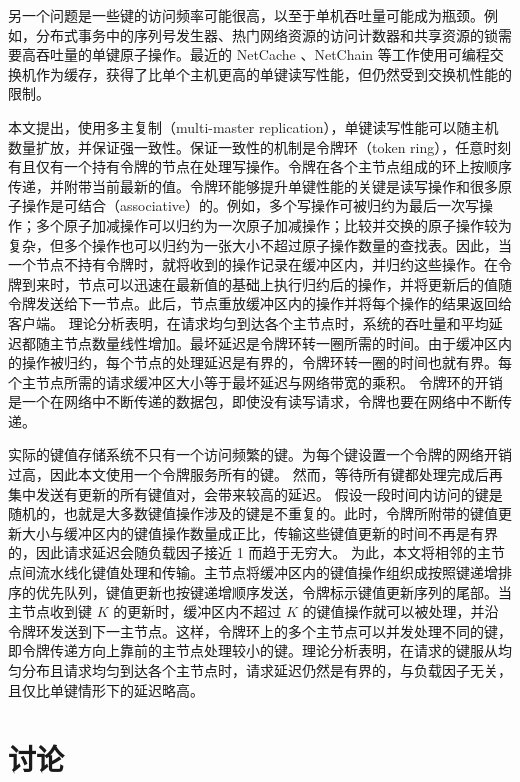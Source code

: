 另一个问题是一些键的访问频率可能很高，以至于单机吞吐量可能成为瓶颈。例如，分布式事务中的序列号发生器、热门网络资源的访问计数器和共享资源的锁需要高吞吐量的单键原子操作。最近的 NetCache \cite{netcache-sosp17}、NetChain \cite{jin2018netchain} 等工作使用可编程交换机作为缓存，获得了比单个主机更高的单键读写性能，但仍然受到交换机性能的限制。

本文提出，使用多主复制（multi-master replication），单键读写性能可以随主机数量扩放，并保证强一致性。保证一致性的机制是令牌环（token ring），任意时刻有且仅有一个持有令牌的节点在处理写操作。令牌在各个主节点组成的环上按顺序传递，并附带当前最新的值。令牌环能够提升单键性能的关键是读写操作和很多原子操作是可结合（associative）的。例如，多个写操作可被归约为最后一次写操作；多个原子加减操作可以归约为一次原子加减操作；比较并交换的原子操作较为复杂，但多个操作也可以归约为一张大小不超过原子操作数量的查找表。因此，当一个节点不持有令牌时，就将收到的操作记录在缓冲区内，并归约这些操作。在令牌到来时，节点可以迅速在最新值的基础上执行归约后的操作，并将更新后的值随令牌发送给下一节点。此后，节点重放缓冲区内的操作并将每个操作的结果返回给客户端。
理论分析表明，在请求均匀到达各个主节点时，系统的吞吐量和平均延迟都随主节点数量线性增加。最坏延迟是令牌环转一圈所需的时间。由于缓冲区内的操作被归约，每个节点的处理延迟是有界的，令牌环转一圈的时间也就有界。每个主节点所需的请求缓冲区大小等于最坏延迟与网络带宽的乘积。
令牌环的开销是一个在网络中不断传递的数据包，即使没有读写请求，令牌也要在网络中不断传递。

实际的键值存储系统不只有一个访问频繁的键。为每个键设置一个令牌的网络开销过高，因此本文使用一个令牌服务所有的键。
然而，等待所有键都处理完成后再集中发送有更新的所有键值对，会带来较高的延迟。
假设一段时间内访问的键是随机的，也就是大多数键值操作涉及的键是不重复的。此时，令牌所附带的键值更新大小与缓冲区内的键值操作数量成正比，传输这些键值更新的时间不再是有界的，因此请求延迟会随负载因子接近 1 而趋于无穷大。
为此，本文将相邻的主节点间流水线化键值处理和传输。主节点将缓冲区内的键值操作组织成按照键递增排序的优先队列，键值更新也按键递增顺序发送，令牌标示键值更新序列的尾部。当主节点收到键 $K$ 的更新时，缓冲区内不超过 $K$ 的键值操作就可以被处理，并沿令牌环发送到下一主节点。这样，令牌环上的多个主节点可以并发处理不同的键，即令牌传递方向上靠前的主节点处理较小的键。理论分析表明，在请求的键服从均匀分布且请求均匀到达各个主节点时，请求延迟仍然是有界的，与负载因子无关，且仅比单键情形下的延迟略高。


\section{讨论}
\label{kvdirect:sec:discussion}


